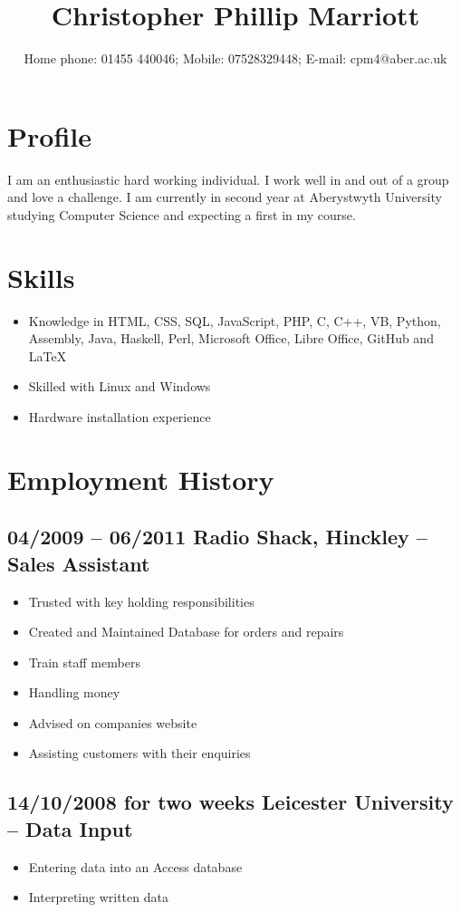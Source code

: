 \documentclass[0pt]{article}
\title{Christopher Phillip Marriott}
\date{Home phone: 01455  440046; Mobile: 07528329448; E-mail: cpm4@aber.ac.uk}
\begin{document}
\maketitle
\thispagestyle{empty}
\pagestyle{empty}

\section*{Profile}
I am an enthusiastic hard working individual. I work well in and out of a group and love a challenge. I am currently in second year at Aberystwyth University studying Computer Science and expecting a first in my course.

\section*{Skills}
\begin{itemize}
	\item Knowledge in HTML, CSS, SQL, JavaScript, PHP, C, C++, VB, Python, Assembly, Java, Haskell, Perl, Microsoft Office, Libre Office, GitHub and 		LaTeX 
	\item Skilled with Linux and Windows
	\item Hardware installation experience
\end{itemize}

\section*{Employment History}
\subsection*{04/2009 -- 06/2011   Radio Shack, Hinckley -- Sales Assistant}
\begin{itemize}
	\item Trusted with key holding responsibilities
	\item Created and Maintained Database for orders and repairs
	\item Train staff members
	\item Handling money
	\item Advised on companies website
	\item Assisting customers with their enquiries
\end{itemize}
	
\subsection*{14/10/2008 for two weeks     Leicester University --  Data Input}
\begin{itemize}
	\item Entering data into an Access database
	\item Interpreting written data
\end{itemize}
\end{document}
